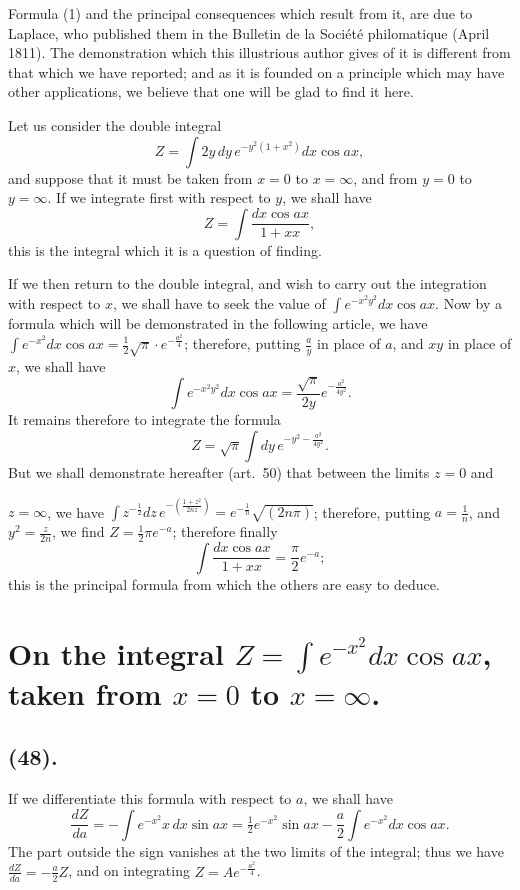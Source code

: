 \documentclass{article}
\begin{document}
Formula (1) and the principal consequences which result from it, are due to Laplace, who published them in the Bulletin de la Société philomatique (April 1811). The demonstration which this illustrious author gives of it is different from that which we have reported; and as it is founded on a principle which may have other applications, we believe that one will be glad to find it here.

Let us consider the double integral
\[ Z=\int2y\,dy\,e^{-y^{2}(1+x^{2})}dx\cos ax, \]
and suppose that it must be taken from $x=0$ to $x=\infty$, and from $y=0$ to $y=\infty$. If we integrate first with respect to $y$, we shall have
\[ Z=\int\frac{dx\cos ax}{1+xx}, \]
this is the integral which it is a question of finding.

If we then return to the double integral, and wish to carry out the integration with respect to $x$, we shall have to seek the value of $\displaystyle\int e^{-x^{2}y^{2}}dx\cos ax$. Now by a formula which will be demonstrated in the following article, we have $\displaystyle\int e^{-x^{2}}dx\cos ax=\tfrac{1}{2}\sqrt{\pi}\cdot e^{-\frac{a^{2}}{4}}$; therefore, putting $\frac{a}{y}$ in place of $a$, and $xy$ in place of $x$, we shall have
\[ \int e^{-x^{2}y^{2}}dx\cos ax=\frac{\sqrt{\pi}}{2y}e^{-\frac{a^{2}}{4y^{2}}}. \]
It remains therefore to integrate the formula
\[ Z=\sqrt{\pi}\int dy\,e^{-y^{2}-\frac{a^{2}}{4y^{2}}}. \]
But we shall demonstrate hereafter (art.\ 50) that between the limits $z=0$ and

$z=\infty$, we have $\displaystyle\int z^{-\frac{1}{2}}dz\,e^{-\left(\frac{1+z^{2}}{2nz}\right)}=e^{-\frac{1}{n}}\sqrt{(2n\pi)}$; therefore, putting $a=\frac{1}{n}$, and $y^{2}=\frac{z}{2n}$, we find $Z=\frac{1}{2}\pi e^{-a}$; therefore finally
\[ \int\frac{dx\cos ax}{1+xx}=\frac{\pi}{2}e^{-a}; \]
this is the principal formula from which the others are easy to deduce.

\section*{On the integral $\displaystyle Z=\int e^{-x^{2}}dx\cos ax$, taken from $x=0$ to $x=\infty$.}

\subsection*{(48).}

If we differentiate this formula with respect to $a$, we shall have
\[ \frac{dZ}{da}=-\int e^{-x^{2}}x\,dx\sin ax=\tfrac{1}{2}e^{-x^{2}}\sin ax-\frac{a}{2}\int e^{-x^{2}}dx\cos ax. \]
The part outside the sign vanishes at the two limits of the integral; thus we have $\frac{dZ}{da}=-\frac{a}{2}Z$, and on integrating $Z=Ae^{-\frac{a^{2}}{4}}$.
\end{document}
